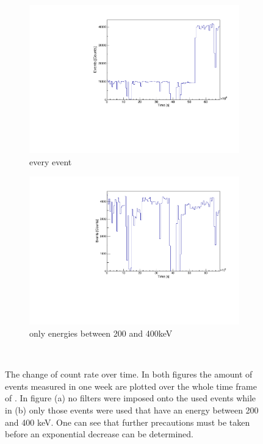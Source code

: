 \documentclass[encoding=utf8,british]{tumphthesis}
\begin{document}
\begin{figure}[t!]
	\centering
	\begin{subfigure}{.5\textwidth}
		\centering
		\includegraphics[width=\textwidth]{./Bilder/ZeitverlaufALLE.pdf}
		\caption{every event}
		\label{fig:ZeitAll}
	\end{subfigure}\hfill%
	\begin{subfigure}{.5\textwidth}
		\centering
		\includegraphics[width=\textwidth]{./Bilder/ZeitverlaufLimits.pdf}
		\caption{only energies between 200 and 400keV}
		\label{fig:ZeitLimits}
	\end{subfigure}
    \\
    \caption{
    	The change of count rate over time. 
    	In both figures the amount of events measured in one week are plotted over the whole time frame of \PII. 
    	In figure (a) no filters were imposed onto the used events while in (b) only those events were used that have an energy between 200 and 400 keV. 
    	One can see that further precautions must be taken before an exponential decrease can be determined. 
    	}
\end{figure}
\end{document}
